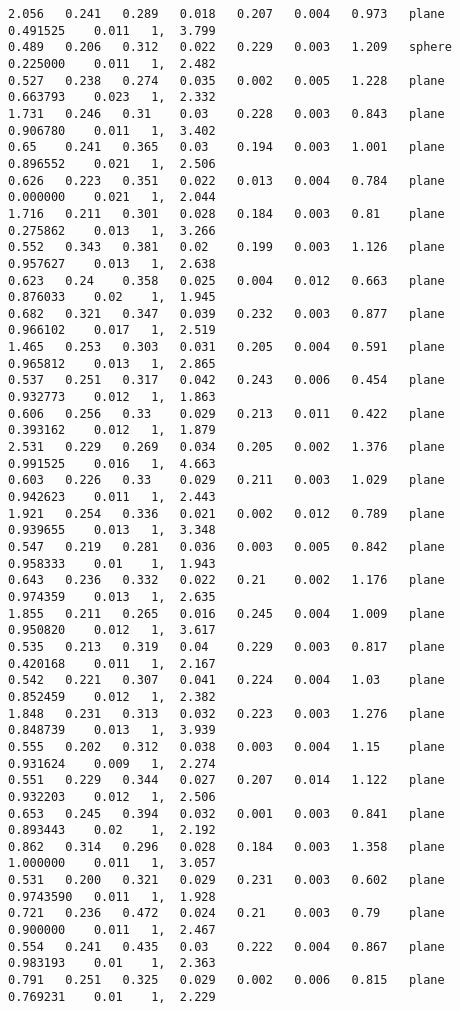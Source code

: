{\begin{lstlisting}[caption={Datos obtenidos para la prueba del plano usando AGC.}]
2.056	0.241	0.289	0.018	0.207	0.004	0.973	plane	0.491525	0.011	1, 	3.799
0.489	0.206	0.312	0.022	0.229	0.003	1.209	sphere	0.225000	0.011	1, 	2.482
0.527	0.238	0.274	0.035	0.002	0.005	1.228	plane	0.663793	0.023	1, 	2.332
1.731	0.246	0.31	0.03	0.228	0.003	0.843	plane	0.906780	0.011	1, 	3.402
0.65	0.241	0.365	0.03	0.194	0.003	1.001	plane	0.896552	0.021	1, 	2.506
0.626	0.223	0.351	0.022	0.013	0.004	0.784	plane	0.000000	0.021	1, 	2.044
1.716	0.211	0.301	0.028	0.184	0.003	0.81	plane	0.275862	0.013	1, 	3.266
0.552	0.343	0.381	0.02	0.199	0.003	1.126	plane	0.957627	0.013	1, 	2.638
0.623	0.24	0.358	0.025	0.004	0.012	0.663	plane	0.876033	0.02	1, 	1.945
0.682	0.321	0.347	0.039	0.232	0.003	0.877	plane	0.966102	0.017	1, 	2.519
1.465	0.253	0.303	0.031	0.205	0.004	0.591	plane	0.965812	0.013	1, 	2.865
0.537	0.251	0.317	0.042	0.243	0.006	0.454	plane	0.932773	0.012	1, 	1.863
0.606	0.256	0.33	0.029	0.213	0.011	0.422	plane	0.393162	0.012	1, 	1.879
2.531	0.229	0.269	0.034	0.205	0.002	1.376	plane	0.991525	0.016	1, 	4.663
0.603	0.226	0.33	0.029	0.211	0.003	1.029	plane	0.942623	0.011	1, 	2.443
1.921	0.254	0.336	0.021	0.002	0.012	0.789	plane	0.939655	0.013	1, 	3.348
0.547	0.219	0.281	0.036	0.003	0.005	0.842	plane	0.958333	0.01	1, 	1.943
0.643	0.236	0.332	0.022	0.21	0.002	1.176	plane	0.974359	0.013	1, 	2.635
1.855	0.211	0.265	0.016	0.245	0.004	1.009	plane	0.950820	0.012	1, 	3.617
0.535	0.213	0.319	0.04	0.229	0.003	0.817	plane	0.420168	0.011	1, 	2.167
0.542	0.221	0.307	0.041	0.224	0.004	1.03	plane	0.852459	0.012	1, 	2.382
1.848	0.231	0.313	0.032	0.223	0.003	1.276	plane	0.848739	0.013	1, 	3.939
0.555	0.202	0.312	0.038	0.003	0.004	1.15	plane	0.931624	0.009	1, 	2.274
0.551	0.229	0.344	0.027	0.207	0.014	1.122	plane	0.932203	0.012	1, 	2.506
0.653	0.245	0.394	0.032	0.001	0.003	0.841	plane	0.893443	0.02	1, 	2.192
0.862	0.314	0.296	0.028	0.184	0.003	1.358	plane	1.000000	0.011	1, 	3.057
0.531	0.200	0.321	0.029	0.231	0.003	0.602	plane	0.9743590	0.011	1, 	1.928
0.721	0.236	0.472	0.024	0.21	0.003	0.79	plane	0.900000	0.011	1, 	2.467
0.554	0.241	0.435	0.03	0.222	0.004	0.867	plane	0.983193	0.01	1, 	2.363
0.791	0.251	0.325	0.029	0.002	0.006	0.815	plane	0.769231	0.01	1, 	2.229
	\end{lstlisting}
}$ $ \\


